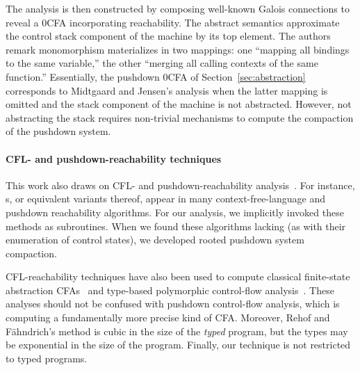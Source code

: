 The analysis is then constructed by composing well-known
Galois connections to reveal a 0CFA incorporating reachability.
The abstract semantics approximate the control stack component of the
machine by its top element.
The authors remark monomorphism materializes in two mappings: one
``mapping all bindings to the same variable,'' the other ``merging all
calling contexts of the same function.''
Essentially, the pushdown 0CFA of Section~\ref{sec:abstraction}
corresponds to Midtgaard and Jensen's analysis when the latter
mapping is omitted and the stack component of the machine is not
abstracted.
However, not abstracting the stack requires non-trivial mechanisms to compute the compaction of the pushdown system.

\paragraph{CFL- and pushdown-reachability techniques}
This work also draws on CFL- and pushdown-reachability
analysis~\cite{mattmight:Bouajjani:1997:PDA-Reachability,dvanhorn:Kodumal2004Set,mattmight:Reps:1998:CFL,mattmight:Reps:2005:Weighted-PDA}.
For instance, \ecg s, or equivalent variants thereof, appear in many
context-free-language and pushdown reachability algorithms.
For our analysis, we implicitly invoked these methods as subroutines.
When we found these algorithms lacking (as with their enumeration of
control states), we developed rooted pushdown system compaction.


CFL-reachability techniques have also been used to compute classical
finite-state abstraction CFAs~\cite{mattmight:Melski:2000:CFL} and
type-based polymorphic control-flow
analysis~\cite{mattmight:Rehof:2001:TypeBased}.
These analyses should not be confused with pushdown control-flow
analysis, which is computing a fundamentally more precise kind of CFA.
Moreover, Rehof and F\"ahndrich's method is cubic in the size of the
\emph{typed} program, but the types may be exponential in the size of
the program.
Finally, our technique is not restricted to typed programs.


